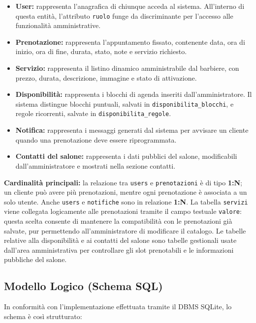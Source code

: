 \documentclass[12pt,a4paper]{article}
\begin{document}
\begin{itemize}
    \item \textbf{User:} rappresenta l'anagrafica di chiunque acceda al sistema. All'interno di questa entità, l'attributo \texttt{ruolo} funge da discriminante per l'accesso alle funzionalità amministrative.
    \item \textbf{Prenotazione:} rappresenta l'appuntamento fissato, contenente data, ora di inizio, ora di fine, durata, stato, note e servizio richiesto.
    \item \textbf{Servizio:} rappresenta il listino dinamico amministrabile dal barbiere, con prezzo, durata, descrizione, immagine e stato di attivazione.
    \item \textbf{Disponibilità:} rappresenta i blocchi di agenda inseriti dall'amministratore. Il sistema distingue blocchi puntuali, salvati in \texttt{disponibilita\_blocchi}, e regole ricorrenti, salvate in \texttt{disponibilita\_regole}.
    \item \textbf{Notifica:} rappresenta i messaggi generati dal sistema per avvisare un cliente quando una prenotazione deve essere riprogrammata.
    \item \textbf{Contatti del salone:} rappresenta i dati pubblici del salone, modificabili dall'amministratore e mostrati nella sezione contatti.
\end{itemize}

\textbf{Cardinalità principali:} la relazione tra \texttt{users} e \texttt{prenotazioni} è di tipo \textbf{1:N}; un cliente può avere più prenotazioni, mentre ogni prenotazione è associata a un solo utente. Anche \texttt{users} e \texttt{notifiche} sono in relazione \textbf{1:N}. La tabella \texttt{servizi} viene collegata logicamente alle prenotazioni tramite il campo testuale \texttt{valore}: questa scelta consente di mantenere la compatibilità con le prenotazioni già salvate, pur permettendo all'amministratore di modificare il catalogo. Le tabelle relative alla disponibilità e ai contatti del salone sono tabelle gestionali usate dall'area amministrativa per controllare gli slot prenotabili e le informazioni pubbliche del salone.

\newpage

\subsection{Modello Logico (Schema SQL)}
In conformità con l'implementazione effettuata tramite il DBMS SQLite, lo schema è così strutturato:
\end{document}
